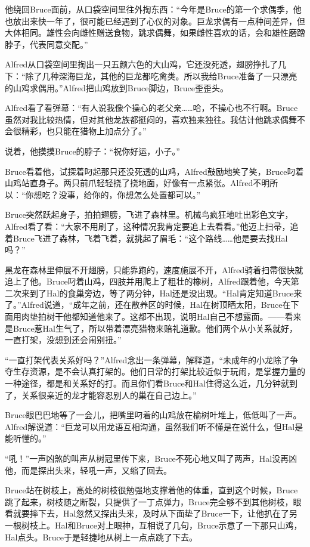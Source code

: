 \documentclass[../main.tex]{subfiles}
\begin{document}
他绕回Bruce面前，从口袋空间里往外掏东西：``今年是Bruce的第一个求偶季，他也放出来快一年了，很可能已经遇到了心仪的对象。巨龙求偶有一点种间差异，但大体相同。雄性会向雌性赠送食物，跳求偶舞，如果雌性喜欢的话，会和雄性磨蹭脖子，代表同意交配。''

Alfred从口袋空间里掏出一只五颜六色的大山鸡，它还没死透，翅膀挣扎了几下：``除了几种深海巨龙，其他的巨龙都吃禽类。所以我给Bruce准备了一只漂亮的山鸡求偶用。''Alfred把山鸡放到Bruce脚边，Bruce歪歪头。

Alfred看了看弹幕：``有人说我像个操心的老父亲\ldots\ldots 哈，不操心也不行啊。Bruce虽然对我比较热情，但对其他龙族都挺闷的，喜欢独来独往。我估计他跳求偶舞不会很精彩，也只能在猎物上加点分了。''

说着，他摸摸Bruce的脖子：``祝你好运，小子。''

Bruce看着他，试探着叼起那只还没死透的山鸡，Alfred鼓励地笑了笑，Bruce叼着山鸡站直身子。两只前爪轻轻挠了挠地面，好像有一点紧张。Alfred不明所以：``你想吃？没事，给你的，你想怎么处置都可以。''

Bruce突然跃起身子，拍拍翅膀，飞进了森林里。机械鸟疯狂地吐出彩色文字，Alfred看了看：``大家不用刷了，这种情况我肯定要追上去看看。''他迈上扫帚，追着Bruce飞进了森林，飞着飞着，就挑起了眉毛：``这个路线\ldots\ldots 他是要去找Hal吗？''

黑龙在森林里伸展不开翅膀，只能靠跑的，速度施展不开，Alfred骑着扫帚很快就追上了他。Bruce叼着山鸡，四肢并用爬上了粗壮的橡树，Alfred跟着他，今天第二次来到了Hal的食巢旁边，等了两分钟，Hal还是没出现。``Hal肯定知道Bruce来了。''Alfred说道，``成年之前，还在散养区的时候，Hal在树顶晒太阳，Bruce在下面用肉垫拍树干他都知道他来了。这都不出现，说明Hal自己不想露面。------看来是Bruce惹Hal生气了，所以带着漂亮猎物来赔礼道歉。他们两个从小关系就好，一直打架，没想到还会闹别扭。''

``一直打架代表关系好吗？''Alfred念出一条弹幕，解释道，``未成年的小龙除了争夺生存资源，是不会认真打架的。他们日常的打架比较近似于玩闹，是掌握力量的一种途径，都是和关系好的打。而且你们看Bruce和Hal住得这么近，几分钟就到了，关系很亲近的龙才能容忍别人的巢在自己边上。''

Bruce眼巴巴地等了一会儿，把嘴里叼着的山鸡放在榆树叶堆上，低低叫了一声。Alfred解说道：``巨龙可以用龙语互相沟通，虽然我们听不懂是在说什么，但Hal是能听懂的。''

``吼！''一声凶煞的叫声从树冠里传下来，Bruce不死心地又叫了两声，Hal没再凶他，而是探出头来，轻吼一声，又缩了回去。

Bruce站在树枝上，高处的树枝很勉强地支撑着他的体重，直到这个时候，Bruce跳了起来，树枝随之断裂，只提供了一丁点弹力，Bruce完全够不到其他树枝，眼看就要摔下去，Hal忽然又探出头来，及时从下面垫了Bruce一下，让他扒在了另一根树枝上。Hal和Bruce对上眼神，互相说了几句，Bruce示意了一下那只山鸡，Hal点头。Bruce于是轻捷地从树上一点点跳了下去。
\end{document}
